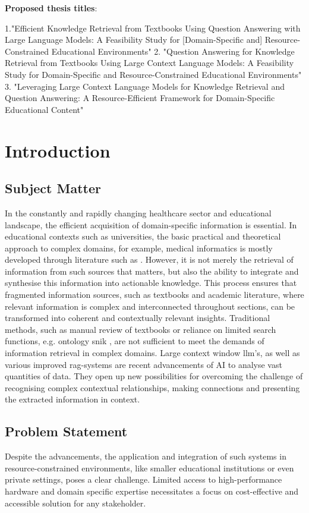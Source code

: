 \textbf{Proposed thesis titles}:

1."Efficient Knowledge Retrieval from Textbooks Using Question Answering with Large Language Models: A Feasibility Study for [Domain-Specific and] Resource-Constrained Educational Environments"
%
2. "Question Answering for Knowledge Retrieval from Textbooks Using Large Context Language Models: 
A Feasibility Study for Domain-Specific and Resource-Constrained Educational Environments"
%
3. "Leveraging Large Context Language Models for Knowledge Retrieval and Question Answering: 
A Resource-Efficient Framework for Domain-Specific Educational Content"
\chapter{Introduction}\label{ch:introduction}
\section{Subject Matter}
In the constantly and rapidly changing healthcare sector and educational landscape, the efficient acquisition of domain-specific information is essential. 
In educational contexts such as universities, the basic practical and theoretical approach to complex domains, for example, medical informatics is mostly developed through literature such as \citet{bb2}.
However, it is not merely the retrieval of information from such sources that matters, but also the ability to integrate and synthesise this information into actionable knowledge.
This process ensures that fragmented information sources, such as textbooks and academic literature, where relevant information is complex and interconnected throughout sections, can be transformed into coherent and contextually relevant insights.
Traditional methods, such as manual review of textbooks or reliance on limited search functions, e.g. ontology \ac{snik} \citep{semantischesnetz}, are not sufficient to meet the demands of information retrieval in complex domains.  
%
Large context window \ac{llm}'s, as well as various improved \ac{rag}-systems are recent advancements of AI to analyse vast quantities of data.
They open up new possibilities for overcoming the challenge of recognising complex contextual relationships, making connections and presenting the extracted information in context.
%
\section{Problem Statement}\label{ch:problem statement}
Despite the advancements, the application and integration of such systems in resource-constrained environments, like smaller educational institutions or even private settings, poses a clear challenge.
Limited access to high-performance hardware and domain specific expertise necessitates a focus on cost-effective and accessible solution for any stakeholder.

